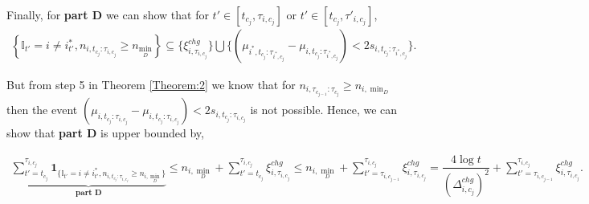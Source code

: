 \begin{customproof}{2}
Finally, for \textbf{part D} we can show that for $t'\in[t_{c_j}, \tau_{i,c_j}]$ or $t'\in[t_{c_j}, \tau'_{i,c_j}]$,
\begin{align*}
\left\lbrace\mathbb{I}_{t'}=i\neq i^*_{t'},n_{i,t_{c_j}:\tau_{i,c_{j}}}\geq  n_{\min_D}\right\rbrace \subseteq \lbrace \xi^{chg}_{i,\tau_{i,c_j}}  \rbrace \bigcup \lbrace (\mu_{i^*,t_{c_j}:\tau_{i^*,c_{j}}} - \mu_{i,t_{c_j}:\tau_{i^*,c_{j}}}) < 2s_{i,t_{c_j}:\tau_{i^*,c_{j}}} \rbrace.
\end{align*}

But from step 5 in Theorem \ref{Theorem:2} we know that for $n_{i,\tau_{c_{j-1}}:\tau_{c_{j}}}\geq n_{i,\min_D}$ then the event $ (\mu_{i,t_{c_j}:\tau_{i,c_{j}}} - \mu_{i,t_{c_j}:\tau_{i,c_{j}}}) < 2s_{i,t_{c_j}:\tau_{i,c_{j}}}$ is not possible. Hence, we can show that \textbf{part D} is upper bounded by,

\begin{align*}
\underbrace{\sum_{t'=t_{c_j}}^{\tau_{i,c_j}}\mathbf{1}_{\lbrace\mathbb{I}_{t'}=i\neq i^*_{t'},n_{i,t_{c_j}:\tau_{i,c_{j}}}\geq n_{i,\min_D}\rbrace}}_{\textbf{part D}} \leq n_{i,\min_D} + \sum_{t'=t_{c_j}}^{\tau_{i,c_j}}\xi^{chg}_{i,\tau_{i,c_j}} \leq n_{i,\min_D} + \sum_{t'=\tau_{i,c_{j-1}}}^{\tau_{i,c_j}}\xi^{chg}_{i,\tau_{i,c_j}} = \dfrac{4\log t}{(\Delta^{chg}_{i,c_{j}})^2} + \sum_{t'=\tau_{i,c_{j-1}}}^{\tau_{i,c_j}}\xi^{chg}_{i,\tau_{i,c_j}}.
\end{align*}



\end{customproof}
